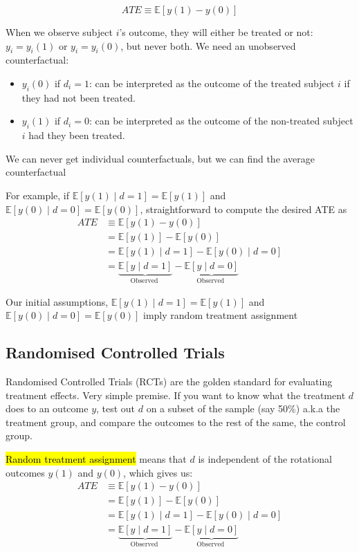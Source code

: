 \documentclass[11pt]{article}
\begin{document}
$$
ATE \equiv \mathbb{E}[y(1)-y(0)]
$$

When we observe subject $i$'s outcome, they will either be treated or not: $y_i = y_i(1)$ or $y_i = y_i(0)$, but never both. We need an unobserved counterfactual:

\begin{itemize}
    \item $y_i(0)$ if $d_i = 1$: can be interpreted as the outcome of the treated subject $i$ if they had not been treated.
    \item $y_i(1)$ if $d_i = 0$: can be interpreted as the outcome of the non-treated subject $i$ had they been treated.
\end{itemize}

\begin{note}
    We can never get individual counterfactuals, but we can find the average counterfactual
\end{note}

 For example, if $\mathbb{E}[y(1) \mid d=1]=\mathbb{E}[y(1)]$ and $\mathbb{E}[y(0) \mid d=0]=\mathbb{E}[y(0)]$, straightforward to compute the desired ATE as
\begin{align*}
    A T E & \equiv \mathbb{E}[y(1)-y(0)] \\
& =\mathbb{E}[y(1)]-\mathbb{E}[y(0)] \\
& =\mathbb{E}[y(1) \mid d=1]-\mathbb{E}[y(0) \mid d=0] \\
& =\underbrace{\mathbb{E}[y \mid d=1]}_{\text {Observed }}-\underbrace{\mathbb{E}[y \mid d=0]}_{\text {Observed }}
\end{align*}

Our initial assumptions, $\mathbb{E}[y(1) \mid d=1]=\mathbb{E}[y(1)]$ and $\mathbb{E}[y(0) \mid d=0]=\mathbb{E}[y(0)]$ imply random treatment assignment


\subsection{Randomised Controlled Trials}

Randomised Controlled Trials (RCTs) are the golden standard for evaluating treatment effects. Very simple premise. If you want to know what the treatment $d$ does to an outcome $y$, test out $d$ on a subset of the sample (say 50\%) a.k.a the treatment group, and compare the outcomes to the rest of the same, the control group.

\hl{Random treatment assignment} means that $d$ is independent of the rotational outcomes $y(1)$ and $y(0)$, which gives us:
\begin{align*}
    A T E & \equiv \mathbb{E}[y(1)-y(0)] \\
& =\mathbb{E}[y(1)]-\mathbb{E}[y(0)] \\
& =\mathbb{E}[y(1) \mid d=1]-\mathbb{E}[y(0) \mid d=0] \\
& =\underbrace{\mathbb{E}[y \mid d=1]}_{\text {Observed }}-\underbrace{\mathbb{E}[y \mid d=0]}_{\text {Observed }}
\end{align*}
\end{document}
